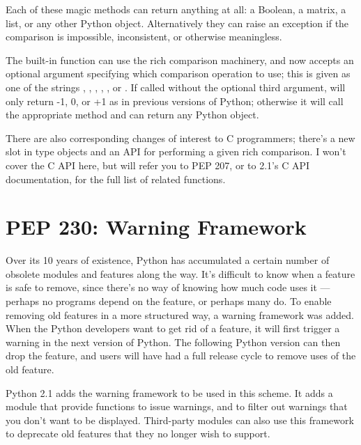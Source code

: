 \documentclass{howto}
\begin{document}
Each of these magic methods can return anything at all: a Boolean, a
matrix, a list, or any other Python object.  Alternatively they can
raise an exception if the comparison is impossible, inconsistent, or
otherwise meaningless.

The built-in  function can use the rich comparison
machinery, and now accepts an optional argument specifying which
comparison operation to use; this is given as one of the strings
, , , , , or
.  If called without the optional third argument,
 will only return -1, 0, or +1 as in previous versions
of Python; otherwise it will call the appropriate method and can
return any Python object.

There are also corresponding changes of interest to C programmers;
there's a new slot  in type objects and an API for
performing a given rich comparison.  I won't cover the C API here, but
will refer you to PEP 207, or to 2.1's C API documentation, for the
full list of related functions.

\begin{seealso}


\end{seealso}

\section{PEP 230: Warning Framework}

Over its 10 years of existence, Python has accumulated a certain
number of obsolete modules and features along the way.  It's difficult
to know when a feature is safe to remove, since there's no way of
knowing how much code uses it --- perhaps no programs depend on the
feature, or perhaps many do.  To enable removing old features in a
more structured way, a warning framework was added.  When the Python
developers want to get rid of a feature, it will first trigger a
warning in the next version of Python.  The following Python version
can then drop the feature, and users will have had a full release
cycle to remove uses of the old feature.

Python 2.1 adds the warning framework to be used in this scheme.  It
adds a  module that provide functions to issue
warnings, and to filter out warnings that you don't want to be
displayed. Third-party modules can also use this framework to
deprecate old features that they no longer wish to support.
\end{document}
